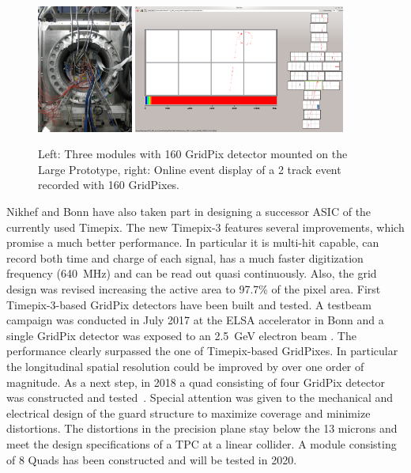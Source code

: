 \begin{figure}[!t]
  \centering
  \includegraphics[width=0.28\textwidth]{Tracker/TPC_Bonn/plots/TPC_pixels_LP_GridPixes.png}
  \includegraphics[width=0.62\textwidth]{Tracker/TPC_Bonn/plots/TPC_pixels_event.png}
  \caption{Left: Three modules with 160 GridPix detector mounted on the Large
    Prototype, right: Online event display of a 2 track event recorded with
    160 GridPixes.}
  \label{fig_TPC_pixels_2}
\end{figure}

Nikhef and Bonn have also taken part in designing a successor ASIC of
the currently used Timepix. The new Timepix-3 features several improvements,
which promise a much better performance. In particular it is multi-hit capable,
can record both time and charge of each signal, has a much faster
digitization frequency (\SI{640}{\mega\hertz}) and can be read out  quasi continuously.
Also, the grid design was revised increasing the active area to 97.7\% of the pixel area. First Timepix-3-based GridPix detectors have been built and tested. A testbeam campaign was conducted in July 2017 at the ELSA accelerator in Bonn and a single GridPix detector was exposed to an \SI{2.5}{GeV} electron beam \cite{Ligtenberg:2018sjs}. The performance clearly surpassed the one of Timepix-based GridPixes. In particular the longitudinal spatial resolution could be improved by over one order of magnitude. 
As a next step, in 2018 a quad consisting of four GridPix detector was constructed and
tested~\cite{Ligtenberg:2020ofy}. Special attention was given to the mechanical and electrical design of the
guard structure to maximize coverage and minimize distortions. The distortions in the
precision plane stay below the 13 microns and meet the design specifications of a TPC at a
linear collider. A module consisting of 8 Quads has been constructed and will be tested in
2020.


